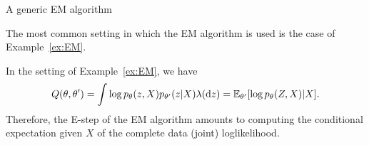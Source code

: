 \documentclass[english,graybox,envcountchap,envcountsame,sectrefs,shortlabels]{svmono}
\theoremstyle{style}
\newcommand{\eqsp}{}
\begin{document}
\begin{algorithm}
\caption{A generic EM algorithm}\label{alg:EM}
\end{algorithm}

The most common setting in which the EM algorithm is used is the case of Example~\ref{ex:EM}. 

\begin{example}
\label{ex:EM:alg}
In the setting of Example~\ref{ex:EM}, we have
$$
Q(\theta,\theta') = \int \log p_\theta(z,X)p_{\theta'}(z|X)\lambda(\rmd z) = \mathbb{E}_{\theta'}[\log p_\theta(Z,X)|X]\eqsp.
$$
Therefore, the E-step of the EM algorithm amounts to computing the conditional expectation given $X$ of the complete data (joint) loglikelihood.
\end{example}
\end{document}
